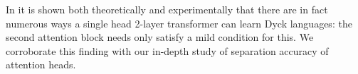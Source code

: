 In \cite{wen2024transformers} it is shown both theoretically and experimentally that there are in fact numerous ways a single head 2-layer transformer can learn Dyck languages: the second attention block needs only satisfy a mild condition for this. We corroborate this finding with our in-depth study of separation accuracy of attention heads.









